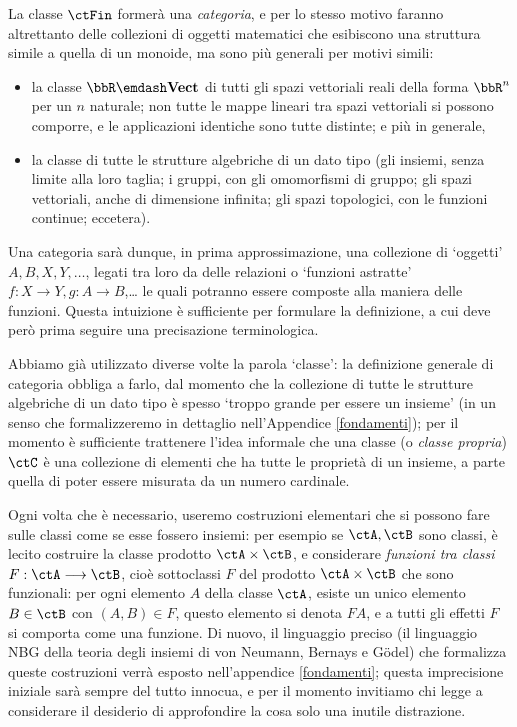 \begin{example}
	La classe \(\ctFin\) formerà una \emph{categoria}, e per lo stesso motivo faranno altrettanto delle collezioni di oggetti matematici che esibiscono una struttura simile a quella di un monoide, ma sono più generali per motivi simili:
	\begin{itemize}
		\item {} la classe \(\bbR\emdash\ctVect\) di tutti gli spazi vettoriali reali della forma \(\bbR^n\) per un \(n\) %
		naturale; non tutte le mappe lineari tra spazi vettoriali si possono comporre, e le applicazioni identiche sono tutte distinte; e più in generale,
		\item la classe di tutte le strutture algebriche di un dato tipo (gli insiemi, senza limite alla loro taglia; i gruppi, con gli omomorfismi di gruppo; gli spazi vettoriali, anche di dimensione infinita; gli spazi topologici, con le funzioni continue; eccetera).
	\end{itemize}
\end{example}
Una categoria sarà dunque, in prima approssimazione, una collezione di `oggetti' \(A,B,X,Y,\dots\), legati tra loro da delle relazioni o `funzioni astratte' \(f : X\to Y, g : A\to B\),\dots{} le quali potranno essere composte alla maniera delle funzioni. Questa intuizione è sufficiente per formulare la definizione, a cui deve però prima seguire una precisazione terminologica.
\begin{remark}
	Abbiamo già utilizzato diverse volte la parola `classe': la definizione generale di categoria obbliga a farlo, dal momento che la collezione di tutte le strutture algebriche di un dato tipo è spesso `troppo grande per essere un insieme' (in un senso che formalizzeremo in dettaglio nell'Appendice \ref{fondamenti}); per il momento è sufficiente trattenere l'idea informale che una classe (o \emph{classe propria}) \(\ctC\) è una collezione di elementi che ha tutte le proprietà di un insieme, a parte quella di poter essere misurata da un numero cardinale.

	Ogni volta che è necessario, useremo costruzioni elementari che si possono fare sulle classi come se esse fossero insiemi: per esempio se \(\ctA,\ctB\) sono classi, è lecito costruire la classe prodotto \(\ctA\times\ctB\), e considerare \emph{funzioni tra classi} \(F : \ctA\fun\ctB\), cioè sottoclassi \(F\) del prodotto \(\ctA\times\ctB\) che sono funzionali: per ogni elemento \(A\) della classe \(\ctA\), esiste un unico elemento \(B\in\ctB\) con \((A,B)\in F\), questo elemento si denota \(FA\), e a tutti gli effetti \(F\) si comporta come una funzione. Di nuovo, il linguaggio preciso (il linguaggio \textsf{NBG} della teoria degli insiemi di von Neumann, Bernays e G\"odel) che formalizza queste costruzioni verrà esposto nell'appendice \ref{fondamenti}; questa imprecisione iniziale sarà sempre del tutto innocua, e per il momento invitiamo chi legge a considerare il desiderio di approfondire la cosa solo una inutile distrazione.
\end{remark}

